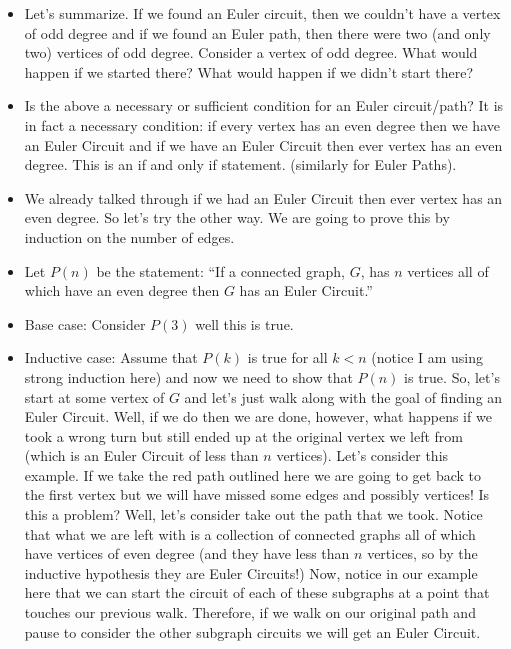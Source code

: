 \documentclass[12pt]{article}
\theoremstyle{plain}
\theoremstyle{definition}
\theoremstyle{remark}
\newcommand{\todayis}[1]{\clearpage{\rhead{\footnotesize #1}}}
\begin{document}
\begin{itemize}
\item Let's summarize. If we found an Euler circuit, then we couldn't have a vertex of odd degree and if we found an Euler path, then there were two (and only two) vertices of odd degree. Consider a vertex of odd degree. What would happen if we started there? What would happen if we didn't start there?
\item Is the above a necessary or sufficient condition for an Euler circuit/path?  It is in fact a necessary condition: if every vertex has an even degree then we have an Euler Circuit and if we have an Euler Circuit then ever vertex has an even degree. This is an if and only if statement. (similarly for Euler Paths).
\item We already talked through if we had an Euler Circuit then ever vertex has an even degree. So let's try the other way. We are going to prove this by induction on the number of edges.
\item Let $P(n)$ be the statement: ``If a connected graph, $G$, has $n$ vertices all of which have an even degree then $G$ has an Euler Circuit.''
\item Base case: Consider $P(3)$ well this is true.
\item Inductive case: Assume that $P(k)$ is true for all $k<n$ (notice I am using strong induction here) and now we need to show that $P(n)$ is true. So, let's start at some vertex of $G$ and let's just walk along with the goal of finding an Euler Circuit. Well, if we do then we are done, however, what happens if we took a wrong turn but still ended up at the original vertex we left from (which is an Euler Circuit of less than $n$ vertices). Let's consider this example. If we take the red path outlined here we are going to get back to the first vertex but we will have missed some edges and possibly vertices! Is this a problem? Well, let's consider take out the path that we took. Notice that what we are left with is a collection of connected graphs all of which have vertices of even degree (and they have less than $n$ vertices, so by the inductive hypothesis they are Euler Circuits!) Now, notice in our example here that we can start the circuit of each of these subgraphs at a point that touches our previous walk. Therefore, if we walk on our original path and pause to consider the other subgraph circuits we will get an Euler Circuit.

\end{itemize}



\todayis{Friday, November 17}
\end{document}
